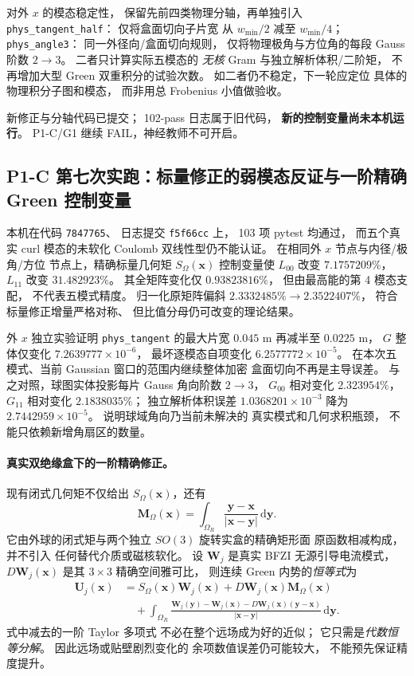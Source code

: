 对外 $x$ 的模态稳定性，
保留先前四类物理分轴，再单独引入
\texttt{phys\_tangent\_half}：
仅将盒面切向子片宽
从 $w_{\min}/2$ 减至 $w_{\min}/4$；
\texttt{phys\_angle3}：
同一外径向/盒面切向规则，
仅将物理极角与方位角的每段
Gauss 阶数 $2\to3$。
二者只计算实际五模态的
\emph{无核} Gram 与独立解析体积/二阶矩，
不再增加大型 Green 双重积分的试验次数。
如二者仍不稳定，下一轮应定位
具体的物理积分子图和模态，
而非用总 Frobenius 小值做验收。

新修正与分轴代码已提交；
102-pass 日志属于旧代码，
\textbf{新的控制变量尚未本机运行}。
P1-C/G1 继续 FAIL，神经教师不可开启。


\subsection{P1-C 第七次实跑：标量修正的弱模态反证与一阶精确 Green 控制变量}
\label{sec:p1-c-affine-green-control}
本机在代码 \texttt{7847765}、
日志提交 \texttt{f5f66cc} 上，
103 项 pytest 均通过，
而五个真实 curl 模态的未软化
Coulomb 双线性型仍不能认证。
在相同外 $x$ 节点与内径/极角/方位
节点上，精确标量几何矩
$S_{\Omega}(\bm x)$ 控制变量使
$L_{00}$ 改变 $7.1757209\%$，
$L_{11}$ 改变 $31.482923\%$。
其全矩阵变化仅 $0.93823816\%$，
但由最高能的第 4 模态支配，
不代表五模式精度。
归一化原矩阵偏斜
$2.3332485\%\to2.3522407\%$，
符合标量修正增量严格对称、
但比值分母仍可改变的理论结果。

外 $x$ 独立实验证明
\texttt{phys\_tangent} 的最大片宽
$0.045$ m 再减半至 $0.0225$ m，
$G$ 整体仅变化
$7.2639777\times10^{-6}$，
最坏逐模态自项变化
$6.2577772\times10^{-5}$。
在本次五模式、当前 Gaussian
窗口的范围内继续整体加密
盒面切向不再是主导误差。
与之对照，球图实体投影每片
Gauss 角向阶数 $2\to3$，
$G_{00}$ 相对变化 $2.323954\%$，
$G_{11}$ 相对变化 $2.1838035\%$；
独立解析体积误差
$1.0368201\times10^{-3}$
降为 $2.7442959\times10^{-5}$。
说明球域角向乃当前未解决的
真实模式和几何求积瓶颈，
不能只依赖新增角扇区的数量。

\paragraph{真实双绝缘盒下的一阶精确修正。}
现有闭式几何矩不仅给出
$S_\Omega(\bm x)$，还有
\[
 \bm M_\Omega(\bm x)=
 \int_{\Omega_R}
 \frac{\bm y-\bm x}{|\bm x-\bm y|}\,
 \mathrm d\bm y .
\]
它由外球的闭式矩与两个独立
$SO(3)$ 旋转实盒的精确矩形面
原函数相减构成，并不引入
任何替代介质或磁核软化。
设 $\bm W_j$ 是真实 BFZI
无源引导电流模式，
$D\bm W_j(\bm x)$ 是其
$3\times3$ 精确空间雅可比，
则连续 Green 内势的\emph{恒等式}为
\begin{align}
 \bm U_j(\bm x)
 &= S_\Omega(\bm x)\bm W_j(\bm x)
   +D\bm W_j(\bm x)\bm M_\Omega(\bm x)
   \nonumber\\[-1mm]
 &\quad+
   \int_{\Omega_R}
   \frac{\bm W_j(\bm y)-\bm W_j(\bm x)
    -D\bm W_j(\bm x)(\bm y-\bm x)}
        {|\bm x-\bm y|}
   \,\mathrm d\bm y .
 \label{eq:p1-c-affine-control}
\end{align}
式中减去的一阶 Taylor 多项式
不必在整个远场成为好的近似；
它只需是\emph{代数恒等分解}。
因此远场或贴壁剧烈变化的
余项数值误差仍可能较大，
不能预先保证精度提升。

